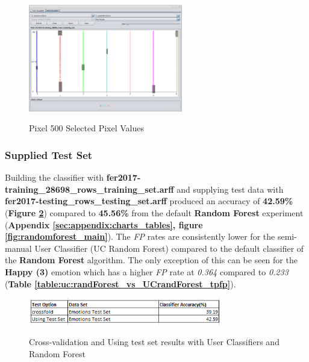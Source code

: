 \FloatBarrier
\begin{figure}[hbt!]
	\centering
      \includegraphics[width=0.6\textwidth]{imgs/userClassifier/noSplit/all/Train-and-Test/500.png} \\
	\caption{Pixel 500 Selected Pixel Values}
	\label{fig:dt:supplied_test_set:pixel500}
\end{figure}

\subsubsection{Supplied Test Set}
\label{sec:dt:uc:sts}

Building the classifier with \textbf{fer2017-training\_28698\_rows\_training\_set.arff} and supplying test data with \textbf{fer2017-testing\_rows\_testing\_set.arff} produced an accuracy of \textbf{42.59\%} (\textbf{Figure \ref{fig:dt:uc:results}}) compared to \textbf{45.56\%} from the default \textbf{Random Forest} experiment (\textbf{Appendix \ref{sec:appendix:charts_tables}, figure \ref{fig:randomforest_main}}). The \textit{FP} rates are consistently lower for the semi-manual User Classifier (UC Random Forest) compared to the default classifier of the \textbf{Random Forest} algorithm. The only exception of this can be seen for the \textbf{Happy (3)} emotion which has a higher \textit{FP} rate at\textit{ 0.364} compared to \textit{0.233} (\textbf{Table \ref{table:uc:randForest_vs_UCrandForest_tpfp}}).

\FloatBarrier
\begin{figure}[hbt!]
	\centering
      \includegraphics[width=0.75\textwidth]{imgs/userClassifier/noSplit/all/userclassifier_accuracy_results.PNG} \\
	\caption{Cross-validation and Using test set results with User Classifiers and Random Forest}
	\label{fig:dt:uc:results}
\end{figure}





